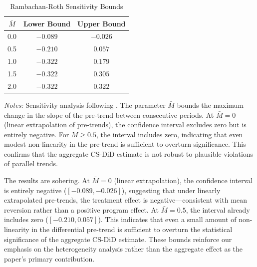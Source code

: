 \documentclass[12pt]{article}
\begin{document}
\begin{table}[htbp]
\centering
\caption{Rambachan-Roth Sensitivity Bounds}
\label{tab:honestdid}
\begin{tabular}{ccc}
\hline\hline
$\bar{M}$ & Lower Bound & Upper Bound \\
\hline
0.0 & $-0.089$ & $-0.026$ \\
0.5 & $-0.210$ & $0.057$ \\
1.0 & $-0.322$ & $0.179$ \\
1.5 & $-0.322$ & $0.305$ \\
2.0 & $-0.322$ & $0.322$ \\
\hline\hline
\end{tabular}
\begin{tablenotes}[flushleft]\small
\item \textit{Notes:} Sensitivity analysis following \citet{rambachan2023more}. The parameter $\bar{M}$ bounds the maximum change in the slope of the pre-trend between consecutive periods. At $\bar{M} = 0$ (linear extrapolation of pre-trends), the confidence interval excludes zero but is entirely negative. For $\bar{M} \geq 0.5$, the interval includes zero, indicating that even modest non-linearity in the pre-trend is sufficient to overturn significance. This confirms that the aggregate CS-DiD estimate is not robust to plausible violations of parallel trends.
\end{tablenotes}
\end{table}

The results are sobering. At $\bar{M} = 0$ (linear extrapolation), the confidence interval is entirely negative ($[-0.089, -0.026]$), suggesting that under linearly extrapolated pre-trends, the treatment effect is negative---consistent with mean reversion rather than a positive program effect. At $\bar{M} = 0.5$, the interval already includes zero ($[-0.210, 0.057]$). This indicates that even a small amount of non-linearity in the differential pre-trend is sufficient to overturn the statistical significance of the aggregate CS-DiD estimate. These bounds reinforce our emphasis on the heterogeneity analysis rather than the aggregate effect as the paper's primary contribution.
\end{document}
